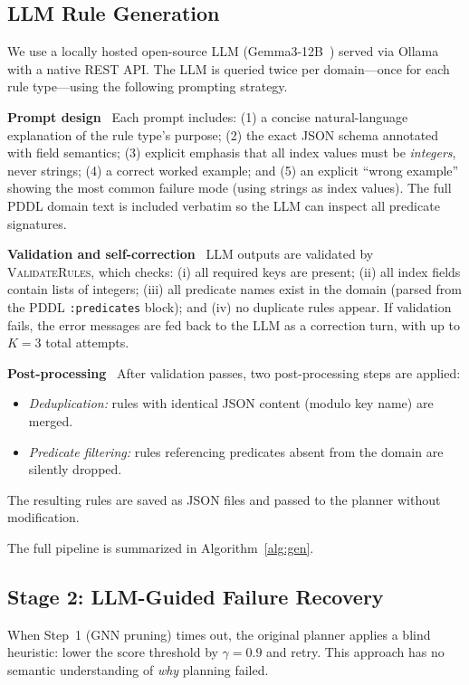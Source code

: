 \documentclass[letterpaper, 10pt, journal, twoside]{IEEEtran}
\newcommand{\myparagraph}[1]{\noindent\textbf{#1}~}
\begin{document}
\subsection{LLM Rule Generation}
\label{sec:generation}

We use a locally hosted open-source LLM (Gemma3-12B~\cite{gemma3_2025}) served via Ollama with a native REST API.
The LLM is queried twice per domain---once for each rule type---using the following prompting strategy.

\myparagraph{Prompt design}
Each prompt includes: (1) a concise natural-language explanation of the rule type's purpose; (2) the exact JSON schema annotated with field semantics; (3) explicit emphasis that all index values must be \emph{integers}, never strings; (4) a correct worked example; and (5) an explicit ``wrong example'' showing the most common failure mode (using strings as index values).
The full PDDL domain text is included verbatim so the LLM can inspect all predicate signatures.

\myparagraph{Validation and self-correction}
LLM outputs are validated by \textsc{ValidateRules}, which checks: (i) all required keys are present; (ii) all index fields contain lists of integers; (iii) all predicate names exist in the domain (parsed from the PDDL \texttt{:predicates} block); and (iv) no duplicate rules appear.
If validation fails, the error messages are fed back to the LLM as a correction turn, with up to $K=3$ total attempts.

\myparagraph{Post-processing}
After validation passes, two post-processing steps are applied:
\begin{itemize}[noitemsep,topsep=2pt]
    \item \emph{Deduplication:} rules with identical JSON content (modulo key name) are merged.
    \item \emph{Predicate filtering:} rules referencing predicates absent from the domain are silently dropped.
\end{itemize}
The resulting rules are saved as JSON files and passed to the planner without modification.

The full pipeline is summarized in Algorithm~\ref{alg:gen}.

\subsection{Stage 2: LLM-Guided Failure Recovery}
\label{sec:stage2}

When Step~1 (GNN pruning) times out, the original planner applies a blind heuristic: lower the score threshold by $\gamma = 0.9$ and retry.
This approach has no semantic understanding of \emph{why} planning failed.
\end{document}
